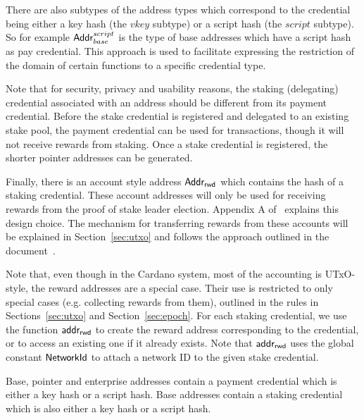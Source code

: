 There are also subtypes of the address types which correspond to the credential
being either a key hash (the $vkey$ subtype) or a script hash (the $script$
subtype). So for example $\mathsf{Addr}_{base}^{script}$ is the type of base addresses
which have a script hash as pay credential. This approach is used to facilitate
expressing the restriction of the domain of certain functions to a specific
credential type.

Note that for security, privacy and usability reasons, the staking (delegating)
credential associated with an address should be different from its payment
credential.  Before the stake credential is registered and delegated to an
existing stake pool, the payment credential can be used for transactions, though
it will not receive rewards from staking.  Once a stake credential is
registered, the shorter pointer addresses can be generated.

Finally, there is an account style address $\mathsf{Addr_{rwd}}$ which contains the hash of
a staking credential. These account addresses will only be used for receiving
rewards from the proof of stake leader election. Appendix A
of~\cite{delegation_design} explains this design choice.  The mechanism for
transferring rewards from these accounts will be explained in
Section~\ref{sec:utxo} and follows the approach outlined in the
document~\cite{chimeric}.

Note that, even though in the Cardano system, most of the
accounting is UTxO-style, the reward addresses are a special case. Their
use is restricted to only special cases (e.g. collecting rewards from them),
outlined in the rules in Sections~\ref{sec:utxo} and Section~\ref{sec:epoch}.
For each staking credential, we use the function $\mathsf{addr_{rwd}}$ to create
the reward address corresponding to the credential, or to access an existing one
if it already exists.
Note that $\mathsf{addr_{rwd}}$ uses the global constant $\mathsf{NetworkId}$ to
attach a network ID to the given stake credential.

Base, pointer and enterprise addresses contain a payment credential which is
either a key hash or a script hash. Base addresses contain a staking credential
which is also either a key hash or a script hash.


